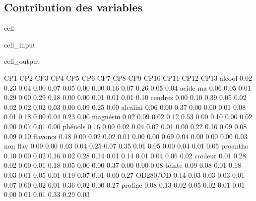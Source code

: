 \documentclass[letterpaper,10pt,french]{sphinxmanual}
\begin{document}
\subsection{Contribution des variables}
\label{\detokenize{acp:contribution-des-variables}}
\begin{sphinxuseclass}{cell}
\begin{sphinxuseclass}{cell_input}
\begin{sphinxVerbatim}[commandchars=\\\{\}]
  \PYG{p}{[}\PYG{p}{]}
    
      \PYG{p}{[}\PYG{p}{]}
        
        \PYG{p}{[}\PYG{p}{]}\PYG{p}{[}\PYG{p}{]}\PYG{p}{[}\PYG{p}{]}\PYG{p}{[}\PYG{p}{]}
     
\end{sphinxVerbatim}

\end{sphinxuseclass}
\begin{sphinxuseclass}{cell_output}
\begin{sphinxVerbatim}[commandchars=\\\{\}]
            	CP1	CP2	CP3	CP4	CP5	CP6	CP7	CP8	CP9	CP10	CP11	CP12	CP13 
  \PYGZpc{} alcool	0.02 	0.23 	0.04 	0.00 	0.07 	0.05 	0.00 	0.00 	0.16 	0.07 	0.26 	0.05 	0.04
  acide ma	0.06 	0.05 	0.01 	0.29 	0.00 	0.29 	0.18 	0.00 	0.00 	0.01 	0.01 	0.01 	0.10
   cendres	0.00 	0.10 	0.39 	0.05 	0.02 	0.02 	0.02 	0.02 	0.03 	0.00 	0.09 	0.25 	0.00
  alcalini	0.06 	0.00 	0.37 	0.00 	0.00 	0.01 	0.08 	0.01 	0.18 	0.00 	0.04 	0.23 	0.00
  magnésiu	0.02 	0.09 	0.02 	0.12 	0.53 	0.00 	0.10 	0.00 	0.02 	0.00 	0.07 	0.01 	0.00
   phénols	0.16 	0.00 	0.02 	0.04 	0.02 	0.01 	0.00 	0.22 	0.16 	0.09 	0.08 	0.09 	0.10
  flavonoï	0.18 	0.00 	0.02 	0.02 	0.01 	0.00 	0.00 	0.69 	0.04 	0.00 	0.00 	0.00 	0.03
  non flav	0.09 	0.00 	0.03 	0.04 	0.25 	0.07 	0.35 	0.01 	0.05 	0.00 	0.04 	0.01 	0.05
  proantho	0.10 	0.00 	0.02 	0.16 	0.02 	0.28 	0.14 	0.01 	0.14 	0.01 	0.04 	0.06 	0.02
   couleur	0.01 	0.28 	0.02 	0.00 	0.01 	0.18 	0.05 	0.00 	0.00 	0.37 	0.00 	0.00 	0.08
    teinte	0.09 	0.08 	0.01 	0.18 	0.03 	0.01 	0.05 	0.01 	0.19 	0.07 	0.01 	0.00 	0.27
  OD280/OD	0.14 	0.03 	0.03 	0.03 	0.01 	0.07 	0.00 	0.02 	0.01 	0.36 	0.02 	0.00 	0.27
   proline	0.08 	0.13 	0.02 	0.05 	0.02 	0.01 	0.01 	0.00 	0.01 	0.01 	0.33 	0.29 	0.03
\end{sphinxVerbatim}

\end{sphinxuseclass}
\end{sphinxuseclass}
\end{document}
